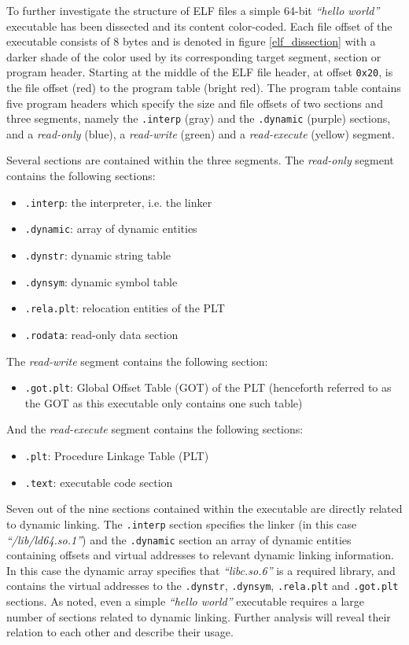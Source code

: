 \documentclass[12pt, a4paper]{article}
\begin{document}
To further investigate the structure of ELF files a simple 64-bit \textit{``hello world''} executable has been dissected and its content color-coded. Each file offset of the executable consists of 8 bytes and is denoted in figure \ref{elf_dissection} with a darker shade of the color used by its corresponding target segment, section or program header. Starting at the middle of the ELF file header, at offset \texttt{0x20}, is the file offset (red) to the program table (bright red). The program table contains five program headers which specify the size and file offsets of two sections and three segments, namely the \texttt{.interp} (gray) and the \texttt{.dynamic} (purple) sections, and a \textit{read-only} (blue), a \textit{read-write} (green) and a \textit{read-execute} (yellow) segment.

Several sections are contained within the three segments. The \textit{read-only} segment contains the following sections:

\begin{itemize}
	\item \texttt{.interp}: the interpreter, i.e. the linker
	\item \texttt{.dynamic}: array of dynamic entities
	\item \texttt{.dynstr}: dynamic string table
	\item \texttt{.dynsym}: dynamic symbol table
	\item \texttt{.rela.plt}: relocation entities of the PLT
	\item \texttt{.rodata}: read-only data section
\end{itemize}

The \textit{read-write} segment contains the following section:

\begin{itemize}
	\item \texttt{.got.plt}: Global Offset Table (GOT) of the PLT (henceforth referred to as the GOT as this executable only contains one such table)
\end{itemize}

And the \textit{read-execute} segment contains the following sections:

\begin{itemize}
	\item \texttt{.plt}: Procedure Linkage Table (PLT)
	\item \texttt{.text}: executable code section
\end{itemize}

Seven out of the nine sections contained within the executable are directly related to dynamic linking. The \texttt{.interp} section specifies the linker (in this case \textit{``/lib/ld64.so.1''}) and the \texttt{.dynamic} section an array of dynamic entities containing offsets and virtual addresses to relevant dynamic linking information. In this case the dynamic array specifies that \textit{``libc.so.6''} is a required library, and contains the virtual addresses to the \texttt{.dynstr}, \texttt{.dynsym}, \texttt{.rela.plt} and \texttt{.got.plt} sections. As noted, even a simple \textit{``hello world''} executable requires a large number of sections related to dynamic linking. Further analysis will reveal their relation to each other and describe their usage.
\end{document}
